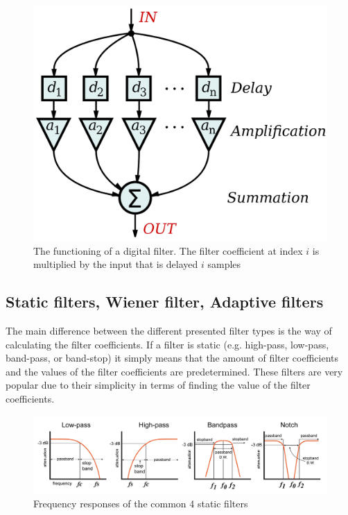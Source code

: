 \begin{figure}[h!t]
	\begin{center}
		\includegraphics[width=0.7\columnwidth]{images/wikipedia_fir_digital_filter.png}
	\end{center}
	\caption{The functioning of a digital filter. The filter coefficient at index $i$ is multiplied by the input that is delayed $i$ samples \cite{wikipedia:digital_fir_filter_image}}
	\label{fig:wiki_digital_filter_working}
\end{figure}

\subsection{Static filters, Wiener filter, Adaptive filters}\label{sec:filters_theory}
The main difference between the different presented filter types is the way of calculating the filter coefficients. If a filter is static (e.g. high-pass, low-pass, band-pass, or band-stop) it simply means that the amount of filter coefficients and the values of the filter coefficients are predetermined. These filters are very popular due to their simplicity in terms of finding the value of the filter coefficients. 

\begin{figure}[h!t]
	\begin{center}
		\includegraphics[width=1.0\columnwidth]{images/Davis_intro_to_filters_filter_types.png}
	\end{center}
	\caption{Frequency responses of the common 4 static filters \cite{intro_to_static_filters}}
	\label{fig:static_filters}
\end{figure}

